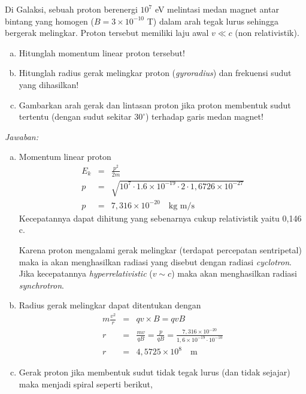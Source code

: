 \documentclass[11pt,fleqn, a4paper]{exam}
\begin{document}
\begin{questions}
\begin{enumerate}[a.]
\end{enumerate}


\vspace{0.5cm}
\question Di Galaksi, sebuah proton berenergi $10^7$ eV melintasi medan magnet antar bintang yang homogen ($B = 3 \times 10^{-10}$ T) dalam arah tegak lurus sehingga bergerak melingkar. Proton tersebut memiliki laju awal $v \ll c$ (non relativistik).
\begin{enumerate}[(a)]
\item Hitunglah momentum linear proton tersebut!
\item Hitunglah radius gerak melingkar proton (\textit{gyroradius}) dan frekuensi sudut yang dihasilkan!
\item Gambarkan arah gerak dan lintasan proton jika proton membentuk sudut tertentu (dengan sudut sekitar $30^{\circ}$) terhadap garis medan magnet!
\end{enumerate}

\textit{Jawaban: }\\
\begin{enumerate}[a.]
\item Momentum linear proton
\begin{eqnarray*}
E_k &=& \frac{p^2}{2m}\\
p &=& \sqrt{10^7 \cdot 1.6 \times 10^{-19} \cdot 2 \cdot 1,6726 \times 10^{-27}}\\
p &=& 7,316 \times 10^{-20} \quad \text{kg m/s}
\end{eqnarray*}
Kecepatannya dapat dihitung yang sebenarnya cukup relativistik yaitu 0,146 c. 

Karena proton mengalami gerak melingkar (terdapat percepatan sentripetal) maka ia akan menghasilkan radiasi yang disebut dengan radiasi \textit{cyclotron}. Jika kecepatannya \textit{hyperrelativistic} ($v \sim c$) maka akan menghasilkan radiasi \textit{synchrotron}.

\item Radius gerak melingkar dapat ditentukan dengan
\begin{eqnarray*}
m\frac{v^2}{r} &=& q v \times B = q v B\\
r &=& \frac{mv}{qB} = \frac{p}{qB} = \frac{7,316 \times 10^{-20}}{1,6 \times 10^{-19} \cdot 10^{-10}}\\
r &=& 4,5725 \times 10^{8} \quad \text{m}
\end{eqnarray*}


\item Gerak proton jika membentuk sudut tidak tegak lurus (dan tidak sejajar) maka menjadi spiral seperti berikut,


\end{enumerate}
\end{questions}
\end{document}
